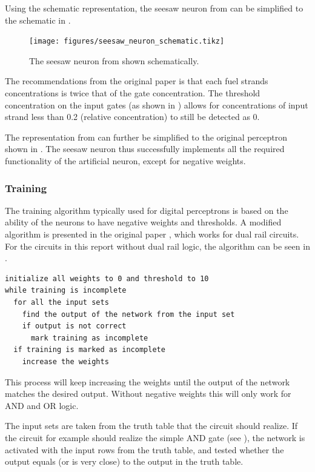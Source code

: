 Using the schematic representation, the seesaw neuron from  can be simplified to the schematic in .

\begin{figure}[h]
  \texttt{[image: figures/seesaw\_neuron\_schematic.tikz]}
  \caption{The seesaw neuron from  shown schematically.}
  \label{seesaw_neuron_schematic}
\end{figure}

The recommendations from the original paper \cite{Qian2011} is that each fuel strands concentrations is twice that of the gate concentration. The threshold concentration on the input gates (as shown in ) allows for concentrations of input strand less than 0.2 (relative concentration) to still be detected as 0.

The representation from  can further be simplified to the original perceptron shown in . The seesaw neuron thus successfully implements all the required functionality of the artificial neuron, except for negative weights.

\subsubsection{Training}
The training algorithm typically used for digital perceptrons is based on the ability of the neurons to have negative weights and thresholds. A modified algorithm is presented in the original paper \cite{Qian2011}, which works for dual rail circuits. For the circuits in this report without dual rail logic, the algorithm can be seen in .

\begin{lstlisting}[float,floatplacement=h,caption=Pseudocode for the seesaw perceptron training algorithm, label=codetraining]
initialize all weights to 0 and threshold to 10
while training is incomplete
  for all the input sets
    find the output of the network from the input set
    if output is not correct
      mark training as incomplete
  if training is marked as incomplete
    increase the weights
\end{lstlisting}

This process will keep increasing the weights until the output of the network matches the desired output. Without negative weights this will only work for AND and OR logic.

The input sets are taken from the truth table that the circuit should realize. If the circuit for example should realize the simple AND gate (see ), the network is activated with the input rows from the truth table, and tested whether the output equals (or is very close) to the output in the truth table.

